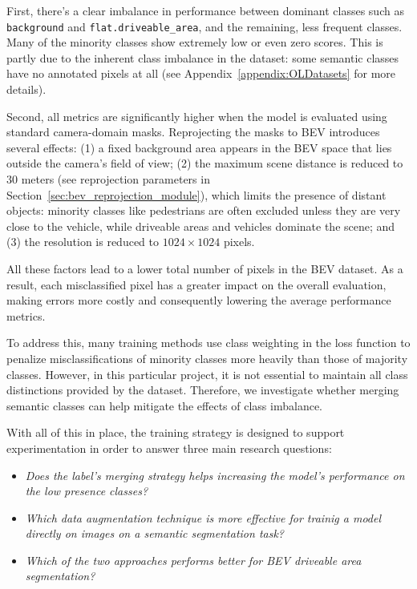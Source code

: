 First, there's a clear imbalance in performance between dominant classes such as \texttt{background} and \texttt{flat.driveable\_area}, and the remaining, less frequent classes. Many of the minority classes show extremely low or even zero  scores. This is partly due to the inherent class imbalance in the dataset: some semantic classes have no annotated pixels at all (see Appendix~\ref{appendix:OLDatasets} for more details).

Second, all metrics are significantly higher when the model is evaluated using standard camera-domain masks. Reprojecting the masks to BEV introduces several effects: (1) a fixed background area appears in the BEV space that lies outside the camera's field of view; (2) the maximum scene distance is reduced to $30$ meters (see reprojection parameters in Section~\ref{sec:bev_reprojection_module}), which limits the presence of distant objects: minority classes like pedestrians are often excluded unless they are very close to the vehicle, while driveable areas and vehicles dominate the scene; and (3) the resolution is reduced to $1024 \times 1024$ pixels.

All these factors lead to a lower total number of pixels in the BEV dataset. As a result, each misclassified pixel has a greater impact on the overall evaluation, making errors more costly and consequently lowering the average performance metrics.

To address this, many training methods use class weighting in the loss function to penalize misclassifications of minority classes more heavily than those of majority classes. However, in this particular project, it is not essential to maintain all class distinctions provided by the dataset. Therefore, we investigate whether merging semantic classes can help mitigate the effects of class imbalance.

With all of this in place, the training strategy is designed to support experimentation in order to answer three main research questions:

\begin{itemize}
    \item \textit{Does the label's merging strategy helps increasing the model's performance on the low presence classes?}
    \item \textit{Which data augmentation technique is more effective for trainig a model directly on  images on a semantic segmentation task?}
    \item \textit{Which of the two approaches performs better for BEV driveable area segmentation?}
\end{itemize}

